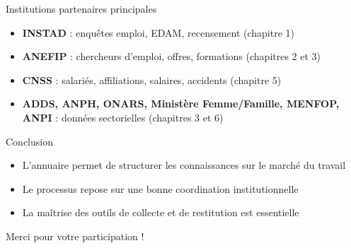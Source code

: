 \documentclass{beamer}
\begin{document}
\begin{frame}{Institutions partenaires principales}
\begin{itemize}
  \item \textbf{INSTAD} : enqu\^etes emploi, EDAM, recensement (chapitre 1)
  \item \textbf{ANEFIP} : chercheurs d’emploi, offres, formations (chapitres 2 et 3)
  \item \textbf{CNSS} : salari\'es, affiliations, salaires, accidents (chapitre 5)
  \item \textbf{ADDS, ANPH, ONARS, Minist\`ere Femme/Famille, MENFOP, ANPI} : donn\'ees sectorielles (chapitres 3 et 6)
\end{itemize}
\end{frame}

\begin{frame}{Conclusion}
\begin{itemize}
  \item L’annuaire permet de structurer les connaissances sur le march\'e du travail
  \item Le processus repose sur une bonne coordination institutionnelle
  \item La ma\^itrise des outils de collecte et de restitution est essentielle
\end{itemize}
\centering
Merci pour votre participation !
\end{frame}
\end{document}
